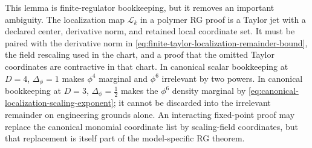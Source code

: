 This lemma is finite-regulator bookkeeping, but it removes an important
ambiguity.  The localization map \(\mathcal L_k\) in a polymer RG proof is
a Taylor jet with a declared center, derivative norm, and retained local
coordinate set.  It must be paired with the derivative norm in
\eqref{eq:finite-taylor-localization-remainder-bound}, the field rescaling
used in the chart, and a proof that the omitted Taylor coordinates are
contractive in that chart.  In canonical scalar bookkeeping at \(D=4\),
\(\Delta_\phi=1\) makes \(\phi^4\) marginal and \(\phi^6\) irrelevant by two
powers.  In canonical bookkeeping at \(D=3\),
\(\Delta_\phi=\frac12\) makes the \(\phi^6\) density marginal by
\eqref{eq:canonical-localization-scaling-exponent}; it cannot be discarded
into the irrelevant remainder on engineering grounds alone.  An interacting
fixed-point proof may replace the canonical monomial coordinate list by scaling-field
coordinates, but that replacement is itself part of the model-specific RG
theorem.

